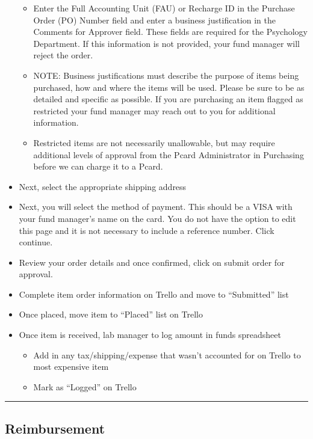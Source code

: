 \documentclass[]{book}
\providecommand{\tightlist}{%
  \setlength{\itemsep}{0pt}\setlength{\parskip}{0pt}}
\begin{document}
\begin{itemize}
  \begin{itemize}
  \tightlist
  \item
    Enter the Full Accounting Unit (FAU) or Recharge ID in the Purchase Order (PO) Number field and enter a business justification in the Comments for Approver field. These fields are required for the Psychology Department. If this information is not provided, your fund manager will reject the order.
  \item
    NOTE: Business justifications must describe the purpose of items being purchased, how and where the items will be used. Please be sure to be as detailed and specific as possible. If you are purchasing an item flagged as restricted your fund manager may reach out to you for additional information.\\
  \item
    Restricted items are not necessarily unallowable, but may require additional levels of approval from the Pcard Administrator in Purchasing before we can charge it to a Pcard.
  \end{itemize}
\item
  Next, select the appropriate shipping address
\item
  Next, you will select the method of payment. This should be a VISA with your fund manager's name on the card. You do not have the option to edit this page and it is not necessary to include a reference number. Click continue.
\item
  Review your order details and once confirmed, click on submit order for approval.
\item
  Complete item order information on Trello and move to ``Submitted'' list
\item
  Once placed, move item to ``Placed'' list on Trello
\item
  Once item is received, lab manager to log amount in funds spreadsheet

  \begin{itemize}
  \tightlist
  \item
    Add in any tax/shipping/expense that wasn't accounted for on Trello to most expensive item
  \item
    Mark as ``Logged'' on Trello
  \end{itemize}
\end{itemize}

\begin{center}\rule{0.5\linewidth}{0.5pt}\end{center}

\hypertarget{reimbursement}{%
\subsection{Reimbursement}\label{reimbursement}}
\end{document}
